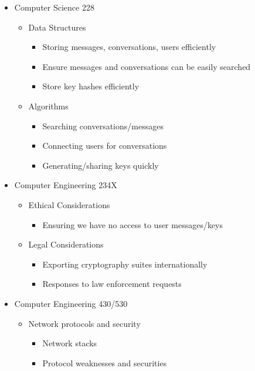 \documentclass[11pt]{article}
\begin{document}
\begin{itemize}
	\item{Computer Science 228}
	\begin{itemize}
		\item{Data Structures}
		\begin{itemize}
			\item{Storing messages, conversations, users efficiently}
			\item{Ensure messages and conversations can be easily searched}
			\item{Store key hashes efficiently}
		\end{itemize}
		\item{Algorithms}
		\begin{itemize}
			\item{Searching conversations/messages}
			\item{Connecting users for conversations}
			\item{Generating/sharing keys quickly}
		\end{itemize}
	\end{itemize}
	
	\item{Computer Engineering 234X}
	\begin{itemize}
		\item{Ethical Considerations}
		\begin{itemize}
			\item{Ensuring we have no access to user messages/keys}
		\end{itemize}
		\item{Legal Considerations}
		\begin{itemize}
			\item{Exporting cryptography suites internationally}
			\item{Responses to law enforcement requests}
		\end{itemize}
	\end{itemize}
	
	\item{Computer Engineering 430/530}
	\begin{itemize}
		\item{Network protocols and security}
		\begin{itemize}
			\item{Network stacks}
			\item{Protocol weaknesses and securities}
		\end{itemize}
	\end{itemize}
\end{itemize}
\end{document}
